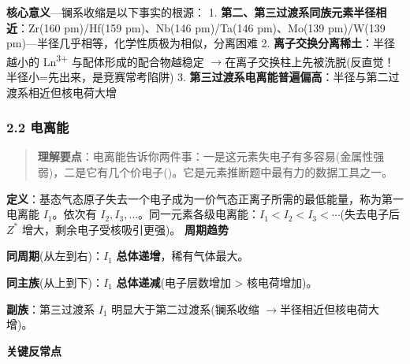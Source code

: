 \documentclass[a4paper,11pt]{ctexart}
\newcommand{\箭}{\ensuremath{\rightarrow}}
\newcommand{\左箭}{\ensuremath{\leftarrow}}
\newcommand{\上箭}{\ensuremath{\uparrow}}
\newcommand{\下箭}{\ensuremath{\downarrow}}
\newcommand{\衡}{\ensuremath{\rightleftharpoons}}
\newcommand{\双箭}{\ensuremath{\leftrightarrow}}
\newcommand{\约等于}{\ensuremath{\approx}}
\newcommand{\小于等于}{\ensuremath{\leq}}
\newcommand{\大于等于}{\ensuremath{\geq}}
\newcommand{\不等于}{\ensuremath{\neq}}
\newcommand{\西格马}{\ensuremath{\sigma}}
\newcommand{\派}{\ensuremath{\pi}}
\begin{document}
\textbf{核心意义}---镧系收缩是以下事实的根源：
1. \textbf{第二、第三过渡系同族元素半径相近}：Zr(160 pm)/Hf(159 pm)、Nb(146 pm)/Ta(146 pm)、Mo(139 pm)/W(139 pm)---半径几乎相等，化学性质极为相似，分离困难
2. \textbf{离子交换分离稀土}：半径越小的 Ln\textsuperscript{3+} 与配体形成的配合物越稳定 \箭 在离子交换柱上先被洗脱(反直觉！半径小=先出来，是竞赛常考陷阱)
3. \textbf{第三过渡系电离能普遍偏高}：半径与第二过渡系相近但核电荷大增

\subsubsection{2.2 电离能}\label{ux7535ux79bbux80fd}

\begin{quote}
\textbf{理解要点}：电离能告诉你两件事：一是这元素失电子有多容易(金属性强弱)，二是它有几个价电子()。它是元素推断题中最有力的数据工具之一。
\end{quote}

\textbf{定义}：基态气态原子失去一个电子成为一价气态正离子所需的最低能量，称为第一电离能 \(I_1\)。依次有 \(I_2, I_3, \dots\)。同一元素各级电离能：\(I_1 < I_2 < I_3 < \cdots\)(失去电子后 \(Z^*\) 增大，剩余电子受核吸引更强)。
\textbf{周期趋势}

\textbf{同周期}(从左到右)：\(I_1\) \textbf{总体递增}，稀有气体最大。

\textbf{同主族}(从上到下)：\(I_1\) \textbf{总体递减}(电子层数增加 \textgreater{} 核电荷增加)。

\textbf{副族}：第三过渡系 \(I_1\) 明显大于第二过渡系(镧系收缩 \箭 半径相近但核电荷大增)。

\textbf{关键反常点}
\end{document}
